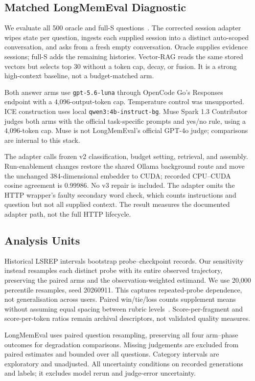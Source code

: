 \documentclass[11pt]{article}
\begin{document}
\subsection{Matched LongMemEval Diagnostic}
We evaluate all 500 oracle and full-S questions~\citep{wu2025longmemeval}. The corrected session adapter wipes state per question, ingests each supplied session into a distinct auto-scoped conversation, and asks from a fresh empty conversation. Oracle supplies evidence sessions; full-S adds the remaining histories. Vector-RAG reads the same stored vectors but selects top 30 without a token cap, decay, or fusion. It is a strong high-context baseline, not a budget-matched arm.

Both answer arms use \texttt{gpt-5.6-luna} through OpenCode Go's Responses endpoint with a 4,096-output-token cap. Temperature control was unsupported. ICE construction uses local \texttt{qwen3:4b-instruct-bg}. Muse Spark 1.3 Contributor judges both arms with the official task-specific prompts and yes/no rule, using a 4,096-token cap. Muse is not LongMemEval's official GPT-4o judge; comparisons are internal to this stack.

The adapter calls frozen v2 classification, budget setting, retrieval, and assembly. Run-enablement changes restore the shared Ollama background route and move the unchanged 384-dimensional embedder to CUDA; recorded CPU--CUDA cosine agreement is 0.99986. No v3 repair is included. The adapter omits the HTTP wrapper's faulty secondary word check, which counts instructions and question but not all supplied context. The result measures the documented adapter path, not the full HTTP lifecycle.

\subsection{Analysis Units}
Historical LSREP intervals bootstrap probe--checkpoint records. Our sensitivity instead resamples each distinct probe with its entire observed trajectory, preserving the paired arms and the observation-weighted estimand. We use 20,000 percentile resamples, seed 20260911. This captures repeated-probe dependence, not generalisation across users. Paired win/tie/loss counts supplement means without assuming equal spacing between rubric levels~\citep{nistSignTest}. Score-per-fragment and score-per-token ratios remain archival descriptors, not validated quality measures.

LongMemEval uses paired question resampling, preserving all four arm--phase outcomes for degradation comparisons. Missing judgements are excluded from paired estimates and bounded over all questions. Category intervals are exploratory and unadjusted. All uncertainty conditions on recorded generations and labels; it excludes model rerun and judge-error uncertainty.
\end{document}

